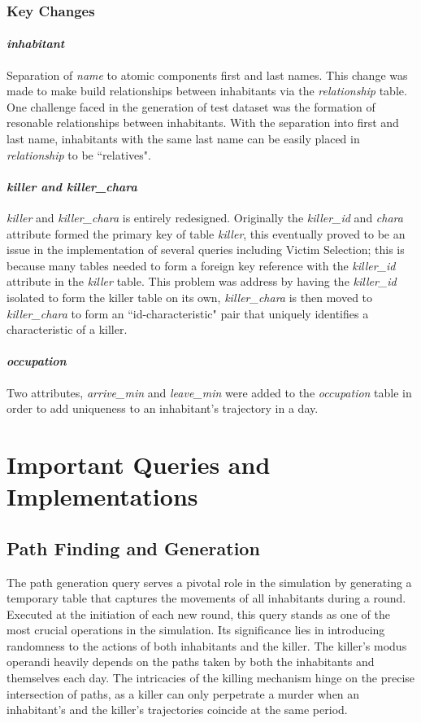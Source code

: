 \documentclass{article}
\begin{document}
\subsubsection{Key Changes}
\paragraph{\textit{inhabitant}}
Separation of \textit{name} to atomic components first and last names. This change was made to make build relationships between inhabitants via the \textit{relationship} table. One challenge faced in the generation of test dataset was the formation of resonable relationships between inhabitants. With the separation into first and last name, inhabitants with the same last name can be easily placed in \textit{relationship} to be ``relatives".

\paragraph{\textit{killer and killer\_chara}}
\textit{killer} and \textit{killer\_chara} is entirely redesigned. Originally the \textit{killer\_id} and \textit{chara} attribute formed the primary key of table \textit{killer}, this eventually proved to be an issue in the implementation of several queries including Victim Selection; this is because many tables needed to form a foreign key reference with the \textit{killer\_id} attribute in the \textit{killer} table. This problem was address by having the \textit{killer\_id} isolated to form the killer table on its own, \textit{killer\_chara} is then moved to \textit{killer\_chara} to form an ``id-characteristic" pair that uniquely identifies a characteristic of a killer.

\paragraph{\textit{occupation}}
Two attributes, \textit{arrive\_min} and \textit{leave\_min} were added to the \textit{occupation} table in order to add uniqueness to an inhabitant's trajectory in a day.

\section{Important Queries and Implementations}
\subsection{Path Finding and Generation}
The path generation query serves a pivotal role in the simulation by generating a temporary table that captures the movements of all inhabitants during a round. Executed at the initiation of each new round, this query stands as one of the most crucial operations in the simulation. Its significance lies in introducing randomness to the actions of both inhabitants and the killer. The killer's modus operandi heavily depends on the paths taken by both the inhabitants and themselves each day. The intricacies of the killing mechanism hinge on the precise intersection of paths, as a killer can only perpetrate a murder when an inhabitant's and the killer's trajectories coincide at the same period.
\end{document}
